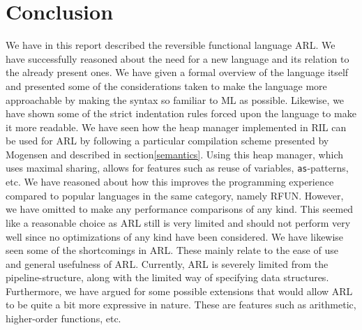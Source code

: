 \documentclass[a4paper]{article}
\begin{document}
\section{Conclusion}
\label{sec:org08edcef}
We have in this report described the reversible functional language ARL. We have successfully reasoned about the need for a new language and its relation to the already present ones. We have given a formal overview of the language itself and presented some of the considerations taken to make the language more approachable by making the syntax so familiar to ML as possible. Likewise, we have shown some of the strict indentation rules forced upon the language to make it more readable. We have seen how the heap manager implemented in RIL can be used for ARL by following a particular compilation scheme presented by Mogensen\cite{patterns} and described in section\ref{semantics}. Using this heap manager, which uses maximal sharing, allows for features such as reuse of variables, \texttt{as}-patterns, etc. We have reasoned about how this improves the programming experience compared to popular languages in the same category, namely RFUN. However, we have omitted to make any performance comparisons of any kind. This seemed like a reasonable choice as ARL still is very limited and should not perform very well since no optimizations of any kind have been considered. We have likewise seen some of the shortcomings in ARL. These mainly relate to the ease of use and general usefulness of ARL. Currently, ARL is severely limited from the pipeline-structure, along with the limited way of specifying data structures. Furthermore, we have argued for some possible extensions that would allow ARL to be quite a bit more expressive in nature. These are features such as arithmetic, higher-order functions, etc.
\end{document}
